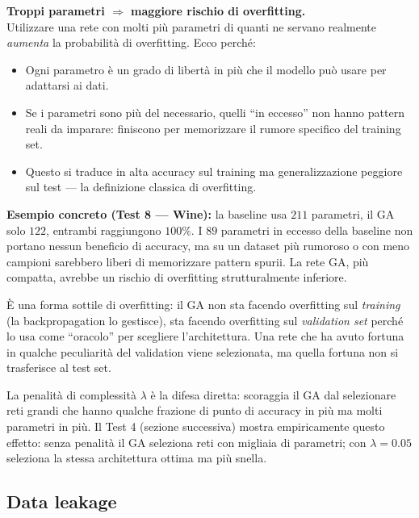 \documentclass[11pt,a4paper]{article}
\begin{document}
\begin{attenzione}
\textbf{Troppi parametri $\Rightarrow$ maggiore rischio di overfitting.}\\
Utilizzare una rete con molti più parametri di quanti ne servano
realmente \emph{aumenta} la probabilità di overfitting. Ecco perché:
\begin{itemize}
    \item Ogni parametro è un grado di libertà in più che il modello può
          usare per adattarsi ai dati.
    \item Se i parametri sono più del necessario, quelli ``in eccesso''
          non hanno pattern reali da imparare: finiscono per memorizzare
          il rumore specifico del training set.
    \item Questo si traduce in alta accuracy sul training ma
          generalizzazione peggiore sul test --- la definizione classica
          di overfitting.
\end{itemize}
\textbf{Esempio concreto (Test 8 --- Wine):} la baseline usa $211$
parametri, il GA solo $122$, entrambi raggiungono $100\%$. I $89$
parametri in eccesso della baseline non portano nessun beneficio di
accuracy, ma su un dataset più rumoroso o con meno campioni sarebbero
liberi di memorizzare pattern spurii. La rete GA, più compatta, avrebbe
un rischio di overfitting strutturalmente inferiore.
\end{attenzione}

\begin{concetto}
È una forma sottile di overfitting: il GA non sta facendo overfitting
sul \emph{training} (la backpropagation lo gestisce), sta facendo
overfitting sul \emph{validation set} perché lo usa come ``oracolo'' per
scegliere l'architettura. Una rete che ha avuto fortuna in qualche
peculiarità del validation viene selezionata, ma quella fortuna non si
trasferisce al test set.
\end{concetto}

La penalità di complessità $\lambda$ è la difesa diretta: scoraggia il
GA dal selezionare reti grandi che hanno qualche frazione di punto di
accuracy in più ma molti parametri in più. Il Test 4 (sezione successiva)
mostra empiricamente questo effetto: senza penalità il GA seleziona reti
con migliaia di parametri; con $\lambda = 0.05$ seleziona la stessa
architettura ottima ma più snella.

\subsection{Data leakage}
\end{document}
